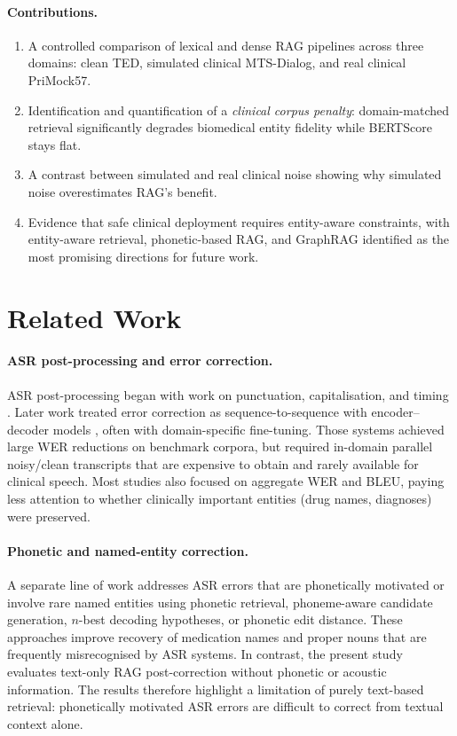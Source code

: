 \documentclass[11pt,a4paper,twocolumn]{article}
\begin{document}
\paragraph{Contributions.}
\begin{enumerate}[leftmargin=1.6em, itemsep=2pt, topsep=3pt]
  \item A controlled comparison of lexical and dense RAG pipelines across three 
  domains: clean TED, simulated clinical MTS-Dialog, and real clinical PriMock57.
  \item Identification and quantification of a \emph{clinical corpus penalty}: 
  domain-matched retrieval significantly degrades biomedical entity fidelity while 
  BERTScore stays flat.
  \item A contrast between simulated and real clinical noise showing why simulated 
  noise overestimates RAG's benefit.
  \item Evidence that safe clinical deployment requires entity-aware constraints, 
  with entity-aware retrieval, phonetic-based RAG, and GraphRAG identified as the 
  most promising directions for future work.
\end{enumerate}

\clearpage
\section{Related Work}

\paragraph{ASR post-processing and error correction.}
ASR post-processing began with work on punctuation, capitalisation, and timing
\cite{shugrina2010}. Later work treated error correction as sequence-to-sequence
with encoder--decoder models \cite{mani2020,guo2021}, often with domain-specific
fine-tuning. Those systems achieved large WER reductions on benchmark corpora,
but required in-domain parallel noisy/clean transcripts that are expensive to
obtain and rarely available for clinical speech. Most studies also focused on
aggregate WER and BLEU, paying less attention to whether clinically important
entities (drug names, diagnoses) were preserved.

\paragraph{Phonetic and named-entity correction.}
A separate line of work addresses ASR errors that are phonetically motivated or
involve rare named entities using phonetic retrieval, phoneme-aware candidate
generation, $n$-best decoding hypotheses, or phonetic edit distance. These
approaches improve recovery of medication names and proper nouns that are
frequently misrecognised by ASR systems. In contrast, the present study
evaluates text-only RAG post-correction without phonetic or acoustic
information. The results therefore highlight a limitation of purely text-based
retrieval: phonetically motivated ASR errors are difficult to correct from
textual context alone.
\end{document}
